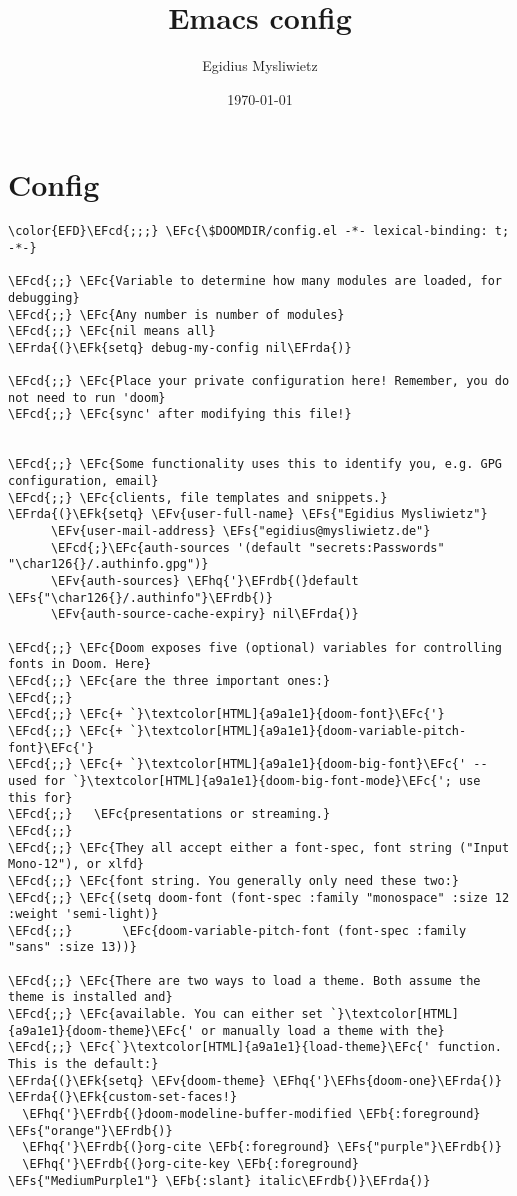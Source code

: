 \documentclass[a4wide,10pt]{article}
\author{Egidius Mysliwietz}
\date{\today}
\title{Emacs config}
\newcommand{\EFc}[1]{\textcolor{EFc}{#1}} %
\newcommand{\EFcd}[1]{\textcolor{EFcd}{#1}} %
\newcommand{\EFs}[1]{\textcolor{EFs}{#1}} %
\newcommand{\EFk}[1]{\textcolor{EFk}{#1}} %
\newcommand{\EFb}[1]{\textcolor{EFb}{#1}} %
\newcommand{\EFv}[1]{\textcolor{EFv}{#1}} %
\newcommand{\EFhq}[1]{\textcolor{EFhq}{#1}} %
\newcommand{\EFhs}[1]{\textcolor{EFhs}{#1}} %
\newcommand{\EFrda}[1]{\textcolor{EFrda}{#1}} %
\newcommand{\EFrdb}[1]{\textcolor{EFrdb}{#1}} %
\begin{document}
\maketitle
\tableofcontents

\section{Config}
\label{sec:org114314b}
\begin{Code}
\begin{Verbatim}
\color{EFD}\EFcd{;;;} \EFc{\$DOOMDIR/config.el -*- lexical-binding: t; -*-}

\EFcd{;;} \EFc{Variable to determine how many modules are loaded, for debugging}
\EFcd{;;} \EFc{Any number is number of modules}
\EFcd{;;} \EFc{nil means all}
\EFrda{(}\EFk{setq} debug-my-config nil\EFrda{)}

\EFcd{;;} \EFc{Place your private configuration here! Remember, you do not need to run 'doom}
\EFcd{;;} \EFc{sync' after modifying this file!}


\EFcd{;;} \EFc{Some functionality uses this to identify you, e.g. GPG configuration, email}
\EFcd{;;} \EFc{clients, file templates and snippets.}
\EFrda{(}\EFk{setq} \EFv{user-full-name} \EFs{"Egidius Mysliwietz"}
      \EFv{user-mail-address} \EFs{"egidius@mysliwietz.de"}
      \EFcd{;}\EFc{auth-sources '(default "secrets:Passwords" "\char126{}/.authinfo.gpg")}
      \EFv{auth-sources} \EFhq{'}\EFrdb{(}default \EFs{"\char126{}/.authinfo"}\EFrdb{)}
      \EFv{auth-source-cache-expiry} nil\EFrda{)}

\EFcd{;;} \EFc{Doom exposes five (optional) variables for controlling fonts in Doom. Here}
\EFcd{;;} \EFc{are the three important ones:}
\EFcd{;;}
\EFcd{;;} \EFc{+ `}\textcolor[HTML]{a9a1e1}{doom-font}\EFc{'}
\EFcd{;;} \EFc{+ `}\textcolor[HTML]{a9a1e1}{doom-variable-pitch-font}\EFc{'}
\EFcd{;;} \EFc{+ `}\textcolor[HTML]{a9a1e1}{doom-big-font}\EFc{' -- used for `}\textcolor[HTML]{a9a1e1}{doom-big-font-mode}\EFc{'; use this for}
\EFcd{;;}   \EFc{presentations or streaming.}
\EFcd{;;}
\EFcd{;;} \EFc{They all accept either a font-spec, font string ("Input Mono-12"), or xlfd}
\EFcd{;;} \EFc{font string. You generally only need these two:}
\EFcd{;;} \EFc{(setq doom-font (font-spec :family "monospace" :size 12 :weight 'semi-light)}
\EFcd{;;}       \EFc{doom-variable-pitch-font (font-spec :family "sans" :size 13))}

\EFcd{;;} \EFc{There are two ways to load a theme. Both assume the theme is installed and}
\EFcd{;;} \EFc{available. You can either set `}\textcolor[HTML]{a9a1e1}{doom-theme}\EFc{' or manually load a theme with the}
\EFcd{;;} \EFc{`}\textcolor[HTML]{a9a1e1}{load-theme}\EFc{' function. This is the default:}
\EFrda{(}\EFk{setq} \EFv{doom-theme} \EFhq{'}\EFhs{doom-one}\EFrda{)}
\EFrda{(}\EFk{custom-set-faces!}
  \EFhq{'}\EFrdb{(}doom-modeline-buffer-modified \EFb{:foreground} \EFs{"orange"}\EFrdb{)}
  \EFhq{'}\EFrdb{(}org-cite \EFb{:foreground} \EFs{"purple"}\EFrdb{)}
  \EFhq{'}\EFrdb{(}org-cite-key \EFb{:foreground} \EFs{"MediumPurple1"} \EFb{:slant} italic\EFrdb{)}\EFrda{)}



\end{Verbatim}
\end{Code}
\end{document}

